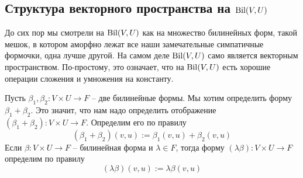 \subsection{Структура векторного пространства на $\operatorname{Bil}(V,U)$}

До сих пор мы смотрели на $\operatorname{Bil}(V, U)$ как на множество билинейных форм, такой мешок, в котором аморфно лежат все наши замечательные симпатичные формочки, одна лучше другой. На самом деле $\operatorname{Bil}(V, U)$ само является векторным пространством. По-простому, это означает, что на $\operatorname{Bil}(V, U)$ есть хорошие операции сложения и умножения на константу. 

\begin{definition}
Пусть $\beta_1,\beta_2\colon V\times U \to F$ -- две билинейные формы. Мы хотим определить форму $\beta_1 + \beta_2$. Это значит, что нам надо определить отображение $(\beta_1 + \beta_2)\colon V\times U \to F$. Определим его по правилу
\[
(\beta_1 + \beta_2)(v, u) := \beta_1(v,u) + \beta_2(v,u)
\]
Если $\beta\colon V\times U \to F$ -- билинейная форма и $\lambda\in F$, тогда форму $(\lambda \beta)\colon V\times U \to F$ определим по правилу
\[
(\lambda\beta)(v, u) := \lambda \beta(v, u)
\]
\end{definition}

